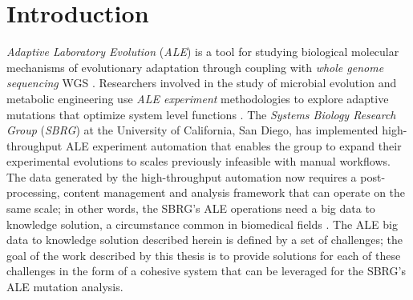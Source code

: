 \documentclass[12pt,final,masters,chapterheads]{ucsd}  %
\begin{document}
%





%   
%   
%
\chapter{Introduction}
%
%
\textit{Adaptive Laboratory Evolution} (\textit{ALE}) is a tool for studying biological molecular mechanisms of evolutionary adaptation through coupling with \textit{whole genome sequencing} WGS \cite{Conrad2011}. Researchers involved in the study of microbial evolution and metabolic engineering use \textit{ALE experiment} methodologies to explore adaptive mutations that optimize system level functions \cite{ASM:/content/journal/microbe/10.1128/microbe.6.69.1}. The \textit{Systems Biology Research Group} (\textit{SBRG}) at the University of  California, San Diego, has implemented high-throughput ALE experiment automation that enables the group to expand their experimental evolutions to scales previously infeasible with manual workflows. The data generated by the high-throughput automation now requires a post-processing, content management and analysis framework that can operate on the same scale; in other words, the SBRG's ALE operations need a big data to knowledge solution, a circumstance common in biomedical fields \cite{Margolis957}. The ALE big data to knowledge solution described herein is defined by a set of challenges; the goal of the work described by this thesis is to provide solutions for each of these challenges in the form of a cohesive system that can be leveraged for the SBRG's ALE mutation analysis.
\end{document}
